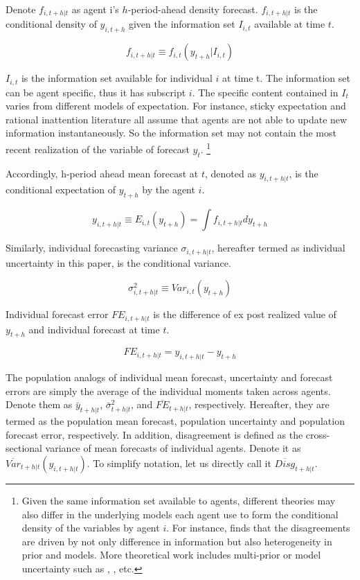 \documentclass[]{article}
\begin{document}
	Denote $ f_{i,t+h|t}$ as agent i's $h$-period-ahead density forecast. $ f_{i,t+h|t}$ is the conditional density of $y_{i,t+h}$ given the information set $I_{i,t}$ available at time $t$. 
	
	$$f_{i,t+h|t} \equiv f_{i,t}(y_{t+h}|I_{i,t})$$
	
	
	$I_{i,t}$ is the information set available for individual $i$ at time t. The information set can be  agent specific, thus it has subscript $i$.  The specific content contained in $I_t$ varies from different models of expectation. For instance, sticky expectation and rational inattention literature all assume that agents are not able to update new information instantaneously. So the information set may not contain the most recent realization of the variable of forecast $y_t$. \footnote{Given the same information set available to agents, different theories may also differ in the underlying models each agent use to form the conditional density of the variables by agent $i$. For instance, \citet{patton2010forecasters} finds that the disagreements are driven by not only difference in information but also heterogeneity in prior and models. More theoretical work includes multi-prior or model uncertainty such as \citet{hansen2001robust}, \citet{hansen2008robustness}, etc.}
	
	Accordingly, h-period ahead mean forecast at $t$, denoted as $ y_{i,t+h|t}$, is the conditional expectation of $y_{t+h}$ by the agent $i$. 
	
	$$y_{i,t+h|t} \equiv E_{i,t}(y_{t+h}) =\int f_{i, t+h|t} d y_{t+h}$$
	
	Similarly, individual forecasting variance $\sigma_{i,t+h|t}$, hereafter termed as individual uncertainty in this paper, is the conditional variance.
	
	$$\sigma^2_{i,t+h|t} \equiv Var_{i,t}( y_{t+h} )$$
	
	Individual forecast error $FE_{i,t+h|t}$ is the difference of ex post realized value of $y_{t+h}$ and individual forecast at time $t$. 
	
	$$FE_{i,t+h|t} = y_{i,t+h|t} - y_{t+h}$$
	
	The population analogs of individual mean forecast, uncertainty and forecast errors are simply the average of the individual moments taken across agents. Denote them as $\bar y_{t+h|t}$, $\bar \sigma^2_{t+h|t}$, and $\overline{FE}_{t+h|t}$, respectively. Hereafter, they are termed as the population mean forecast, population uncertainty and population forecast error, respectively. In addition, disagreement is defined as the cross-sectional variance of mean forecasts of individual agents.  Denote it as $\overline{Var}_{t+h|t}(y_{i,t+h|t}) $. To simplify notation, let us directly call it $\overline{Disg}_{t+h|t}$.  
	
\end{document}
